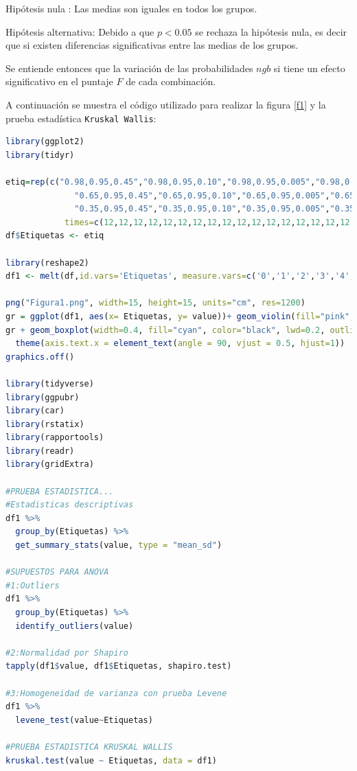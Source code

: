 \documentclass{article}
\begin{document}
Hipótesis nula : Las medias son iguales en todos los grupos.
\smallskip

Hipótesis alternativa: Debido a que $p < 0.05$ se rechaza la hipótesis nula, es decir que si existen diferencias significativas entre las medias de los grupos. 
\bigskip

Se entiende entonces que la variación de las probabilidades $ngb$ si tiene un efecto significativo en el puntaje $F$ de cada combinación.
\bigskip

A continuación se muestra el código utilizado para realizar la figura \ref{f1} y la prueba estadística \texttt{Kruskal Wallis}:

\lstset{style=mystyle}
\begin{lstlisting}[language=R, caption= Código para graficar y realizar la prueba estadística \texttt{Kruskal Wallis}.]
library(ggplot2)
library(tidyr)

etiq=rep(c("0.98,0.95,0.45","0.98,0.95,0.10","0.98,0.95,0.005","0.98,0.75,0.45","0.98,0.75,0.10","0.98,0.75,0.005","0.98,0.55,0.45","0.98,0.55,0.10","0.98,0.55,0.005",
              "0.65,0.95,0.45","0.65,0.95,0.10","0.65,0.95,0.005","0.65,0.75,0.45","0.65,0.75,0.10","0.65,0.75,0.005","0.65,0.55,0.45","0.65,0.55,0.10","0.65,0.55,0.005",
              "0.35,0.95,0.45","0.35,0.95,0.10","0.35,0.95,0.005","0.35,0.75,0.45","0.35,0.75,0.10","0.35,0.75,0.005","0.35,0.55,0.45","0.35,0.55,0.10","0.35,0.55,0.005"),
            times=c(12,12,12,12,12,12,12,12,12,12,12,12,12,12,12,12,12,12,12,12,12,12,12,12,12,12,12))
df$Etiquetas <- etiq 

library(reshape2)
df1 <- melt(df,id.vars='Etiquetas', measure.vars=c('0','1','2','3','4','5','6','7','8','9'))

png("Figura1.png", width=15, height=15, units="cm", res=1200)
gr = ggplot(df1, aes(x= Etiquetas, y= value))+ geom_violin(fill="pink", color="purple", lwd=0.2)
gr + geom_boxplot(width=0.4, fill="cyan", color="black", lwd=0.2, outlier.size = 0.6)+ labs(x="Combinacion de probabilidades (n,g,b)", y= "F-score") +
  theme(axis.text.x = element_text(angle = 90, vjust = 0.5, hjust=1))
graphics.off()

library(tidyverse)
library(ggpubr)
library(car)
library(rstatix)
library(rapportools)
library(readr)
library(gridExtra)

#PRUEBA ESTADISTICA...
#Estadisticas descriptivas
df1 %>%
  group_by(Etiquetas) %>%
  get_summary_stats(value, type = "mean_sd")

#SUPUESTOS PARA ANOVA
#1:Outliers
df1 %>%
  group_by(Etiquetas) %>%
  identify_outliers(value)

#2:Normalidad por Shapiro
tapply(df1$value, df1$Etiquetas, shapiro.test)

#3:Homogeneidad de varianza con prueba Levene
df1 %>%
  levene_test(value~Etiquetas)

#PRUEBA ESTADISTICA KRUSKAL WALLIS
kruskal.test(value ~ Etiquetas, data = df1)
\end{lstlisting}
\end{document}
